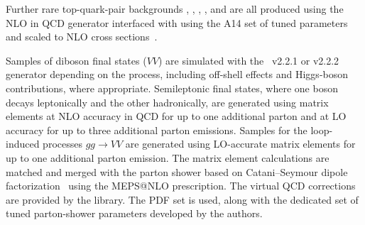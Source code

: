 Further rare top-quark-pair backgrounds \ttt, \ttZZ, \ttWW, \ttWZ, \ttWH and \ttHH are all produced using the NLO in QCD \mgamc generator interfaced with \pythia using the A14 set of tuned parameters and scaled to NLO cross sections~\cite{deFlorian:2016spz}.

Samples of diboson final states ($VV$) are simulated with the \sherpa~v2.2.1 or v2.2.2~\cite{Bothmann:2019yzt} generator depending on the process, including off-shell effects and Higgs-boson contributions, where appropriate.
Semileptonic final states, where one boson decays leptonically and the other hadronically, are generated using matrix elements at NLO accuracy in QCD for up to one additional parton and at LO accuracy for up to three additional parton emissions.
Samples for the loop-induced processes $gg \to VV$ are generated using LO-accurate matrix elements for up to one additional parton emission.
The matrix element calculations are matched and merged with the \sherpa parton shower based on Catani--Seymour dipole factorization~\cite{Gleisberg:2008fv,Schumann:2007mg} using the MEPS@NLO prescription.
The virtual QCD corrections are provided by the \openloops library.
The \nnpdfnnlo PDF set is used, along with the dedicated set of tuned parton-shower parameters developed by the \sherpa authors.


